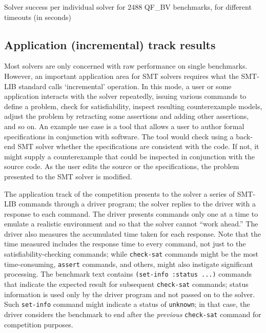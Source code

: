 \documentclass[twoside,11pt]{article}
\begin{document}
\begin{table}
\centering

\caption{Solver success per individual solver for 2488 QF\_BV benchmarks, for different timeouts (in seconds)}
\label{Fig:winners}
\end{table}

\subsection{Application (incremental) track results}
\label{sec:application-results}

Most solvers are only concerned with raw performance on single benchmarks. However, an important application area for SMT solvers requires what the SMT-LIB standard calls `incremental' operation.
In this mode, a user or some application interacts with the solver repeatedly, issuing various commands to define a problem, check for satisfiability, inspect resulting counterexample models, adjust the problem by retracting some assertions and adding other assertions, and so on. An example use case is a tool that allows a user to author formal specifications in conjunction with software. The tool would
check using a back-end SMT solver whether the specifications are consistent with the code. If not, it might
supply a counterexample that could be inspected in conjunction with the source code. As the user edits the source or the specifications, the problem presented to the SMT solver is modified. 

The application track of the competition presents to the solver a series of SMT-LIB commands through a driver program; the solver replies to the driver with a 
response to each command. The driver presents commands only one at a time to emulate a realistic environment and so that the solver cannot ``work ahead.'' The driver also measures the accumulated time taken for each response. Note that the time measured includes the response time to every command, not just to the satisfiability-checking commands; while \lstinline{check-sat} commands might be the most time-consuming, \lstinline{assert} commands, and others, might also instigate significant processing. The benchmark text contains \lstinline{(set-info :status ...)} commands that 
indicate the expected result for subsequent \lstinline{check-sat} commands; status information is used only by the driver program and not passed on to the solver. Such \lstinline{set-info} command might indicate a status of \lstinline{unknown}; in that case, the driver
considers the benchmark to end after the \emph{previous} \lstinline{check-sat} command for competition purposes.
\end{document}
